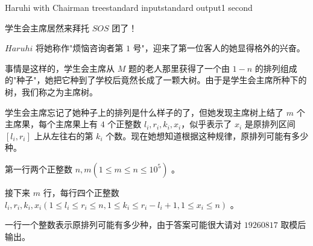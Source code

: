 \begin{problem}{Haruhi with Chairman tree}{standard input}{standard output}{1 second}

学生会主席居然来拜托 $SOS$ 团了！

$Haruhi$ 将她称作"烦恼咨询者第 $1$ 号"，迎来了第一位客人的她显得格外的兴奋。

事情是这样的，学生会主席从 $M$ 题的老人那里获得了一个由 $1-n$ 的排列组成的"种子"，她把它种到了学校后竟然长成了一颗大树。由于是学生会主席所种下的树，我们称之为主席树。

学生会主席忘记了她种子上的排列是什么样子的了，但她发现主席树上结了 $m$ 个主席果，每个主席果上有 $4$ 个正整数 $l_i,r_i,k_i,x_i$，似乎表示了 $x_i$ 是原排列区间 $[l_i,r_i]$ 上从左往右的第 $k_i$ 个数。现在她想知道根据这种规律，原排列可能有多少种。

\InputFile

第一行两个正整数 $n,m(1 \leq m \leq n \leq 10^5)$ 。

接下来 $m$ 行，每行四个正整数 $l_i,r_i,k_i,x_i(1 \leq l_i \leq r_i \leq n,1 \leq k_i \leq r_i-l_i+1,1 \leq x_i \leq n)$ 。

\OutputFile

一行一个整数表示原排列可能有多少种，由于答案可能很大请对 $19260817$ 取模后输出。

\Examples
\begin{example}
%
\end{example}
\end{problem}
